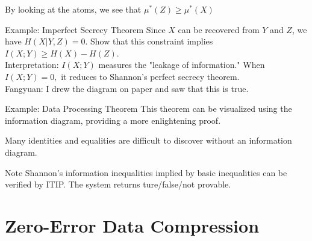 \documentclass[../main.tex]{subfiles}
\begin{document}
\newline
By looking at the atoms, we see that $\mu^*(Z)\geq \mu^*(X)$
\begin{pbox}{Example: Imperfect Secrecy Theorem}
    Since $X$ can be recovered from $Y$ and $Z$, we have $H(X|Y,Z)=0$. Show that this constraint implies $I(X;Y)\geq H(X)-H(Z)$.\\
    Interpretation: $I(X;Y)$ measures the "leakage of information." When $I(X;Y)=0,$ it reduces to Shannon's perfect secrecy theorem.\\
    Fangyuan: I drew the diagram on paper and saw that this is true.
\end{pbox}
\begin{pbox}{Example: Data Processing Theorem}
    This theorem can be visualized using the information diagram, providing a more enlightening proof.
\end{pbox}
\begin{remark}
    Many identities and equalities are difficult to discover without an information diagram. 
\end{remark}
Note Shannon's information inequalities implied by basic inequalities can be verified by ITIP. The system returns ture/false/not provable.



\chapter{Zero-Error Data Compression} 
\end{document}
